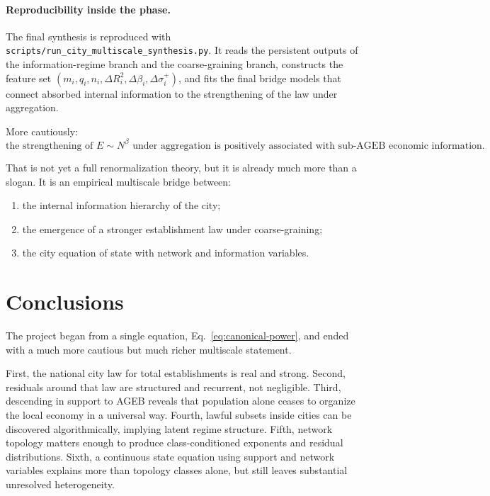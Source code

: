 \documentclass[11pt]{article}
\begin{document}
\paragraph{Reproducibility inside the phase.}
The final synthesis is reproduced with
\texttt{scripts/run\_city\_multiscale\_synthesis.py}.
It reads the persistent outputs of the information-regime branch and the coarse-graining branch, constructs the feature set
\((m_i,q_i,n_i,\Delta R_i^2,\Delta\beta_i,\Delta\sigma_i^{+})\),
and fits the final bridge models that connect absorbed internal information to the strengthening of the law under aggregation.

More cautiously:
\begin{equation}
\text{the strengthening of } E\sim N^\beta \text{ under aggregation is positively associated with sub-AGEB economic information.}
\end{equation}

That is not yet a full renormalization theory, but it is already much more than a slogan. It is an empirical multiscale bridge between:
\begin{enumerate}[label=\arabic*.,leftmargin=2.0em]
\item the internal information hierarchy of the city;
\item the emergence of a stronger establishment law under coarse-graining;
\item the city equation of state with network and information variables.
\end{enumerate}

\section{Conclusions}

The project began from a single equation, Eq.~\eqref{eq:canonical-power}, and ended with a much more cautious but much richer multiscale statement.

First, the national city law for total establishments is real and strong. Second, residuals around that law are structured and recurrent, not negligible. Third, descending in support to AGEB reveals that population alone ceases to organize the local economy in a universal way. Fourth, lawful subsets inside cities can be discovered algorithmically, implying latent regime structure. Fifth, network topology matters enough to produce class-conditioned exponents and residual distributions. Sixth, a continuous state equation using support and network variables explains more than topology classes alone, but still leaves substantial unresolved heterogeneity.
\end{document}
